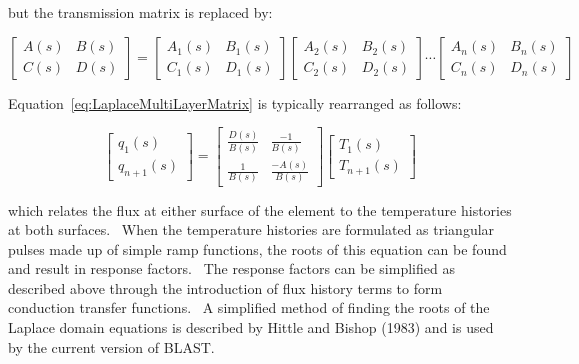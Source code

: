 but the transmission matrix is replaced by:

\begin{equation}
\left[ {\begin{array}{*{20}{c}}{A\left( s \right)}&{B\left( s \right)}\\ {C\left( s \right)}&{D\left( s \right)}\end{array}} \right] = \left[ {\begin{array}{*{20}{c}}{{A_1}\left( s \right)}&{{B_1}\left( s \right)}\\ {{C_1}\left( s \right)}&{{D_1}\left( s \right)}\end{array}} \right]\left[ {\begin{array}{*{20}{c}}{{A_2}\left( s \right)}&{{B_2}\left( s \right)}\\ {{C_2}\left( s \right)}&{{D_2}\left( s \right)}\end{array}} \right] \cdots \left[ {\begin{array}{*{20}{c}}{{A_n}\left( s \right)}&{{B_n}\left( s \right)}\\ {{C_n}\left( s \right)}&{{D_n}\left( s \right)}\end{array}} \right]
\end{equation}

Equation~\ref{eq:LaplaceMultiLayerMatrix} is typically rearranged as follows:

\begin{equation}
\left[ {\begin{array}{*{20}{c}}{{q_1}\left( s \right)}\\ {{q_{n + 1}}\left( s \right)}\end{array}} \right] = \left[ {\begin{array}{*{20}{c}}{\frac{{D\left( s \right)}}{{B\left( s \right)}}}&{\frac{{ - 1}}{{B\left( s \right)}}}\\ {\frac{1}{{B\left( s \right)}}}&{\frac{{ - A\left( s \right)}}{{B\left( s \right)}}}\end{array}} \right]\left[ {\begin{array}{*{20}{c}}{{T_1}\left( s \right)}\\ {{T_{n + 1}}\left( s \right)}\end{array}} \right]
\label{eq:LaplaceTransformDeriv631}
\end{equation}

which relates the flux at either surface of the element to the temperature histories at both surfaces.~ When the temperature histories are formulated as triangular pulses made up of simple ramp functions, the roots of this equation can be found and result in response factors.~ The response factors can be simplified as described above through the introduction of flux history terms to form conduction transfer functions.~ A simplified method of finding the roots of the Laplace domain equations is described by Hittle and Bishop (1983) and is used by the current version of BLAST.

